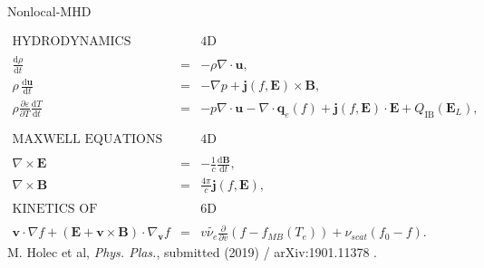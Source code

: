 \documentclass[8pt, compress]{beamer}
\newcommand{\vect}[1]{\boldsymbol{#1}}
\newcommand{\dI}{\text{d}}
\newcommand{\nue}{\nu_{e}}
\newcommand{\nuscat}{\nu_{scat}}
\newcommand{\E}{\vect{E}}
\newcommand{\fzero}{f_0}
\begin{document}
\begin{frame}
\begin{center}
{\huge Nonlocal-MHD}  

\begin{eqnarray}
  \text{HYDRODYNAMICS} && \text{4D} \nonumber \\
  && \nonumber \\
  \frac{\dI \rho}{\dI t} &=& - \rho\nabla\cdot\vect{u} , 
  \nonumber\\ 
  \rho\, \frac{\dI \vect{u}}{\dI t} &=& - \nabla p 
  + \vect{j}(f, \vect{E}) \times \vect{B}, 
  \nonumber\\   
  \rho \frac{\partial \varepsilon}{\partial T}\frac{\dI T}{\dI t}
  &=& 
  - p \nabla\cdot\vect{u} - \nabla\cdot\vect{q}_e(f) 
  + \vect{j}(f, \E)\cdot\E
  + Q_{\text{IB}}(\vect{E}_L) , 
  \nonumber \\
  && \nonumber \\
  && \nonumber \\
  \text{MAXWELL EQUATIONS} && \text{4D} \nonumber \\
  && \nonumber \\
  \nabla\times\vect{E} &=& -\frac{1}{c}\frac{\dI \vect{B}}{\dI t} ,
  \nonumber \\
  \nabla\times\vect{B} &=& \frac{4\pi}{c}
  \vect{j}(f, \vect{E}) ,%
  \nonumber \\
  && \nonumber \\
  \text{KINETICS OF ELECTRONS} && \text{6D} \nonumber \\
  && \nonumber \\
  \vect{v}\cdot\nabla f +
  \left( \vect{E} + \vect{v}\times\vect{B}\right)\cdot\nabla_{\vect{v}} f
  &=& 
  v \tilde{\nue} \frac{\partial }{\partial v}\left(f - f_{MB}(T_e)\right)
  + \nuscat \left(\fzero - f \right) .
  \nonumber
\end{eqnarray}
{\small M. Holec et al, \textit{Phys. Plas.}, submitted (2019) / arXiv:1901.11378 .}
\end{center}
\end{frame}
\end{document}
